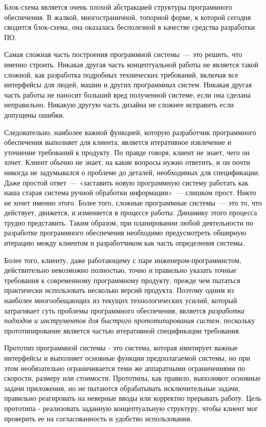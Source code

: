Блок-схема является очень плохой абстракцией структуры программного обеспечения.
В жалкой, многостраничной, топорной форме, к которой сегодня сводится
блок-схема, она оказалась бесполезной в качестве средства разработки ПО.

Самая сложная часть построения программной системы\ --- это решить, что именно
строить. Никакая другая часть концептуальной работы не является такой сложной,
как разработка подробных технических требований, включая все интерфейсы для
людей, машин и других программных систем. Никакая другая часть работы не наносит
больший вред полученной системе, если она сделана неправильно. Никакую другую
часть дизайна не сложнее исправить если допущены ошибки.

Следовательно, наиболее важной функцией, которую разработчик программного
обеспечения выполняет для клиента, является итеративное извлечение и уточнение
требований к продукту. По правде говоря, клиент не знает, чего он хочет. Клиент
обычно не знает, на какие вопросы нужно ответить, и он почти никогда не
задумывался о проблеме до деталей, необходимых для спецификации. Даже простой
ответ\ --- «заставить новую программную систему работать как наша старая система
ручной обработки информации»\ --- слишком прост. Никто не хочет именно этого.
Более того, сложные программные системы\ --- это то, что действует, движется, и
изменяется в процессе работы. Динамику этого процесса трудно представить. Таким
образом, при планировании любой деятельности по разработке программного
обеспечения необходимо предусмотреть обширную итерацию между клиентом и
разработчиком как часть определения системы.

Более того, клиенту, даже работающему с паре инженером-програм\-мистом,
действительно невозможно полностью, точно и правильно указать точные требования
к современному программному продукту, прежде чем пытаться практически
использовать несколько версий продукта. Поэтому одним из наиболее многообещающих
из текущих технологических усилий, который затрагивает суть проблемы
программного обеспечения, является \emph{разработка подходов и инструментов для
быстрого прототипирования систем}, поскольку прототипирование является частью
итеративной спецификации требования.

Прототип программной системы - это система, которая имитирует важные интерфейсы
и выполняет основные функции предполагаемой системы, но при этом необязательно
ограничивается теми же аппаратными ограничениями по скорости, размеру или
стоимости. Прототипы, как правило, выполняют основные задачи приложения, но не
пытаются обрабатывать исключительные задачи, правильно реагировать на неверные
вводы или корректно прерывать работу. Цель прототипа - реализовать заданную
концептуальную структуру, чтобы клиент мог проверить ее на согласованность и
удобство использования.

